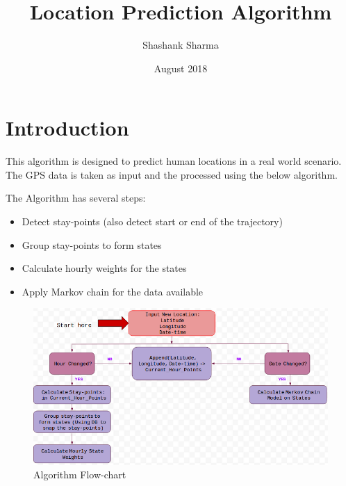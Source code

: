 \documentclass{article}
\title{Location Prediction Algorithm}
\author{Shashank Sharma }
\date{August 2018}
\begin{document}
\maketitle

\section{Introduction}
This algorithm is designed to predict human locations in a real world scenario. The GPS data is taken as input and the processed using the below algorithm.


The Algorithm has several steps:
\begin{itemize}
\item Detect stay-points (also detect start or end of the trajectory)
\item Group stay-points to form states
\item Calculate hourly weights for the states
\item Apply Markov chain for the data available
\end{itemize}

\begin{figure}[h!]
\centering
\includegraphics[scale=.46]{Flowchart_Algo.png}
\caption{Algorithm Flow-chart}
\label{fig:flow-chart}
\end{figure}
\end{document}
